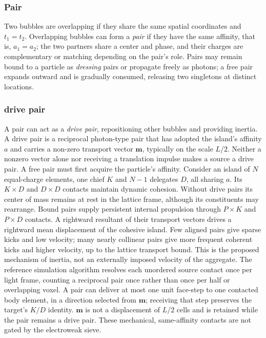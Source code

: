 \documentclass{ijuc}
\begin{document}
\subsubsection{Pair}
Two bubbles are overlapping if they share the same spatial coordinates and $t_1=t_2$. Overlapping bubbles can form a \emph{pair} if they have the same affinity, that is, $a_1=a_2$; the two partners share a center and phase, and their charges are complementary or matching depending on the pair's role. Pairs may remain bound to a particle as \emph{dressing} pairs or propagate freely as photons; a free pair expands outward and is gradually consumed, releasing two singletons at distinct locations.
\subsubsection{drive pair} \label{subsubsec:drive pair}
A pair can act as a \textit{drive pair}, repositioning other bubbles and providing inertia.
A drive pair is a reciprocal photon-type pair that has adopted the island's affinity $a$ and carries a non-zero transport vector $\boldsymbol{m}$, typically on the scale $L/2$. Neither a nonzero vector alone nor receiving a translation impulse makes a source a drive pair. A free pair must first acquire the particle's affinity.
Consider an island of $N$ equal-charge elements, one chief $K$ and $N-1$ delegates $D$, all sharing $a$. Its $K\times D$ and $D\times D$ contacts maintain dynamic cohesion. Without drive pairs its center of mass remains at rest in the lattice frame, although its constituents may rearrange. Bound pairs supply persistent internal propulsion through $P\times K$ and $P\times D$ contacts. A rightward resultant of their transport vectors drives a rightward mean displacement of the cohesive island. Few aligned pairs give sparse kicks and low velocity; many nearly collinear pairs give more frequent coherent kicks and higher velocity, up to the lattice transport bound. This is the proposed mechanism of inertia, not an externally imposed velocity of the aggregate.
The reference simulation algorithm resolves each unordered source contact once per light frame, counting a reciprocal pair once rather than once per half or overlapping voxel. A pair can deliver at most one unit face-step to one contacted body element, in a direction selected from $\boldsymbol{m}$; receiving that step preserves the target's $K/D$ identity. $\boldsymbol{m}$ is not a displacement of $L/2$ cells and is retained while the pair remains a drive pair. These mechanical, same-affinity contacts are not gated by the electroweak sieve.
\end{document}
